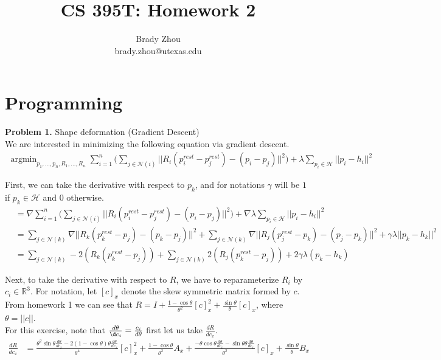 \documentclass[a4paper]{article}
\title{CS 395T: Homework 2}
\author{Brady Zhou \\ brady.zhou@utexas.edu}
\DeclareMathOperator*{\argmin}{argmin}
\begin{document}
\maketitle

\section{Programming}

\textbf{Problem 1.} Shape deformation (Gradient Descent) \\

We are interested in minimizing the following equation via gradient descent.
\begin{align*}
    \argmin_{p_1, \ldots, p_n, R_1, \ldots, R_n} \sum_{i=1}^n \Big( \sum_{j \in \mathcal{N}(i)} ||R_i (p_i^{rest} - p_j^{rest}) - (p_i - p_j)||^2 \Big) + \lambda \sum_{p_i \in \mathcal{H}} ||p_i - h_i||^2
\end{align*}

First, we can take the derivative with respect to $p_k$, and for notations $\gamma$ will be $1$ if $p_k \in \mathcal{H}$ and $0$ otherwise.
\begin{align*}
    &= \nabla \sum_{i=1}^n \Big( \sum_{j \in \mathcal{N}(i)} ||R_i (p_i^{rest} - p_j^{rest}) - (p_i - p_j)||^2 \Big) + \nabla \lambda \sum_{p_i \in \mathcal{H}} ||p_i - h_i||^2 \\
    &= \sum_{j \in \mathcal{N}(k)} \nabla ||R_k (p_k^{rest} - p_j) - (p_k - p_j)||^2 + \sum_{j \in \mathcal{N}(k)} \nabla ||R_j (p_j^{rest} - p_k) - (p_j - p_k)||^2 + \gamma \lambda ||p_k - h_k||^2 \\
    &= \sum_{j \in \mathcal{N}(k)}-2 (R_k (p_k^{rest} - p_j)) + \sum_{j \in \mathcal{N}(k)} 2 (R_j (p_k^{rest} - p_j)) + 2 \gamma \lambda (p_k - h_k)
\end{align*}

Next, to take the derivative with respect to $R$, we have to reparameterize $R_i$ by $c_i \in \mathbb{R}^3$. For notation, let $[c]_x$ denote the skew symmetric matrix formed by $c$. From homework 1 we can see that $R = I + \frac{1 - \cos \theta}{\theta^2} [c]_x^2 + \frac{\sin \theta}{\theta} [c]_x$, where $\theta = ||c||$. \\

For this exercise, note that $\frac{d\theta}{\d c_i} = \frac{c_i}{d\theta}$ first let us take $\frac{dR}{dc_x}$.
\begin{align*}
    \frac{dR}{dc_x} &= \frac{\theta^2 \sin \theta \frac{d\theta}{dc_x} - 2 (1 - \cos \theta) \theta \frac{d\theta}{d c_x}}{\theta^4} [c]_x^2 + \frac{1 - \cos \theta}{\theta^2} A_x + \frac{-\theta \cos \theta \frac{d\theta}{dc_x} - \sin \theta \theta \frac{d\theta}{dc_x}}{\theta^2} [c]_x + \frac{\sin \theta}{\theta} B_x
\end{align*}
\end{document}
